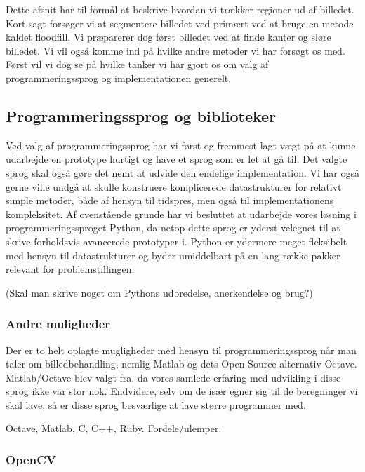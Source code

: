 {
{\sffamily Dette afsnit har til formål at beskrive hvordan vi trækker
regioner ud af billedet. Kort sagt forsøger vi at segmentere billedet
ved primært ved at bruge en metode kaldet floodfill. Vi præparerer dog
først billedet ved at finde kanter og sløre billedet. Vi vil også komme
ind på hvilke andre metoder vi har forsøgt os med. Først vil vi dog se
på hvilke tanker vi har gjort os om valg af programmeringssprog og
implementationen generelt.
}

\subsection{Programmeringssprog og biblioteker}
Ved valg af programmeringssprog har vi først og fremmest lagt vægt på at
kunne udarbejde en prototype hurtigt og have et sprog som er let at gå
til. Det valgte sprog skal også gøre det nemt at udvide den endelige
implementation. Vi har også gerne ville undgå at skulle konstruere
komplicerede datastrukturer for relativt simple metoder, både af hensyn
til tidspres, men også til implementationens kompleksitet. Af
ovenstående grunde har vi besluttet at udarbejde vores løsning i
programmeringssproget Python, da netop dette sprog er yderst velegnet
til at skrive forholdsvis avancerede prototyper i. Python er
ydermere meget fleksibelt med hensyn til datastrukturer og byder
umiddelbart på en lang række pakker relevant for problemstillingen.

(Skal man skrive noget om Pythons udbredelse, anerkendelse og brug?)

\subsubsection{Andre muligheder}
Der er to helt oplagte mugligheder med hensyn til programmeringssprog
når man taler om billedbehandling, nemlig Matlab og dets Open
Source-alternativ Octave. Matlab/Octave blev valgt fra, da vores samlede
erfaring med udvikling i disse sprog ikke var stor nok. Endvidere, selv
om de især egner sig til de beregninger vi skal lave, så er disse sprog
besværlige at lave større programmer med.

Octave, Matlab, C, C++, Ruby. Fordele/ulemper.

\subsubsection*{OpenCV}

}
